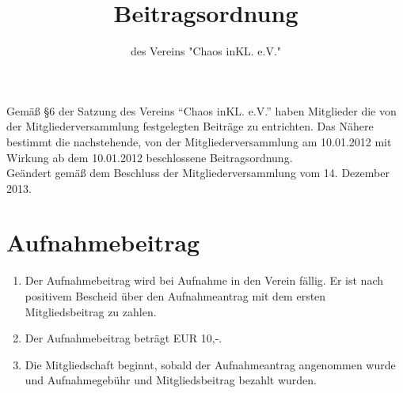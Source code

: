 \documentclass[a4paper, 12pt]{scrartcl}
\begin{document}
\title{Beitragsordnung}
\subtitle{des Vereins "Chaos inKL. e.V."}
\author{}
\date{}

\maketitle

\noindent Gemäß §6 der Satzung des Vereins "`Chaos inKL. e.V."'
haben Mitglieder die von der Mitgliederversammlung
festgelegten Beiträge zu entrichten. Das Nähere bestimmt die
nachstehende, von der Mitgliederversammlung am 10.01.2012 mit Wirkung ab
dem 10.01.2012 beschlossene Beitragsordnung. \\[0.5cm]
Geändert gemäß dem Beschluss der Mitgliederversammlung vom 14. Dezember 2013.

\section{Aufnahmebeitrag}
\begin{enumerate}
	\item Der Aufnahmebeitrag wird bei Aufnahme in den Verein fällig. Er ist nach positivem Bescheid über den Aufnahmeantrag mit dem ersten Mitgliedsbeitrag zu zahlen.
	\item Der Aufnahmebeitrag beträgt EUR 10,-.
	\item Die Mitgliedschaft beginnt, sobald der Aufnahmeantrag angenommen wurde und Aufnahmegebühr und Mitgliedsbeitrag bezahlt wurden.
\end{enumerate}
\end{document}
